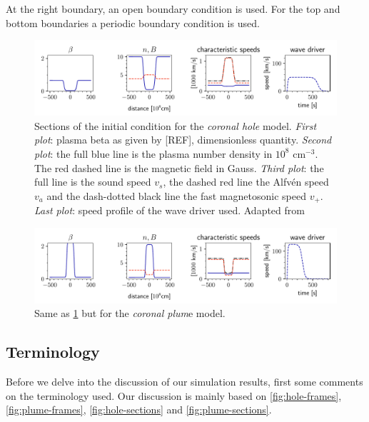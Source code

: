 At the right boundary, an open boundary condition is used. For the top and bottom boundaries a periodic boundary condition is used.

\begin{figure}[H]
	\centering
	\includegraphics[width=.9\linewidth]{images/sections-initial-condition-hole.pdf}
	\caption{Sections of the initial condition for the \emph{coronal hole} model. 
		\emph{First plot}: plasma beta as given by [REF], dimensionless quantity.
		\emph{Second plot}: the full blue line is the plasma number density in $10^8$ cm$^{-3}$.
The red dashed line is the magnetic field in Gauss.
\emph{Third plot}: the full line is the sound speed $v_s$, the dashed red line the Alfvén speed $v_a$ and the dash-dotted black line the fast magnetosonic speed $v_+$.
\emph{Last plot}: speed profile of the wave driver used.
Adapted from \cite{coronal-hole}}
	\label{fig:hole-initial}
\end{figure}

\begin{figure}[H]
	\centering
	\includegraphics[width=.9\linewidth]{images/sections-initial-condition-plume.pdf}
	\caption{Same as \cref{fig:hole-initial} but for the \emph{coronal plum}e model.}
	\label{fig:plume-initial}
\end{figure}

\subsection{Terminology}
Before we delve into the discussion of our simulation results, first some comments on the terminology used.
Our discussion is mainly based on \cref{fig:hole-frames}, \cref{fig:plume-frames}, \cref{fig:hole-sections} and \cref{fig:plume-sections}.

